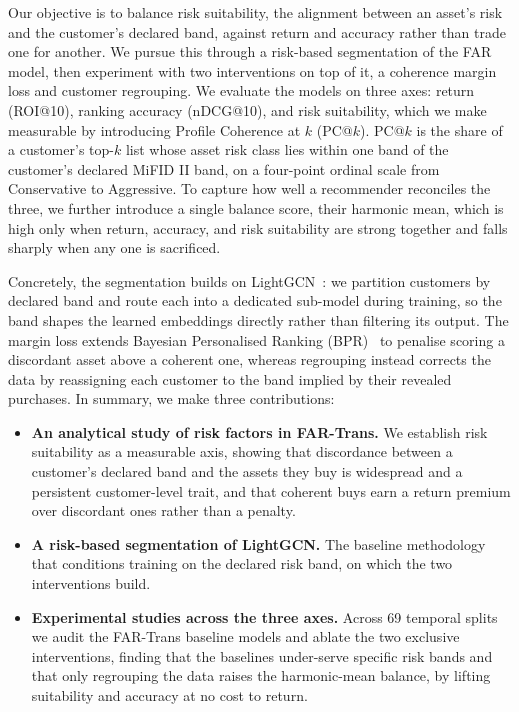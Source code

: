 Our objective is to balance risk suitability, the alignment between an asset's risk and the customer's declared band, against return and accuracy rather than trade one for another. We pursue this through a risk-based segmentation of the FAR model, then experiment with two interventions on top of it, a coherence margin loss and customer regrouping. We evaluate the models on three axes: return (ROI@10), ranking accuracy (nDCG@10), and risk suitability, which we make measurable by introducing Profile Coherence at $k$ (PC@$k$). PC@$k$ is the share of a customer's top-$k$ list whose asset risk class lies within one band of the customer's declared MiFID II band, on a four-point ordinal scale from Conservative to Aggressive. To capture how well a recommender reconciles the three, we further introduce a single balance score, their harmonic mean, which is high only when return, accuracy, and risk suitability are strong together and falls sharply when any one is sacrificed.

Concretely, the segmentation builds on LightGCN~\cite{he2020lightgcnsimplifyingpoweringgraph}: we partition customers by declared band and route each into a dedicated sub-model during training, so the band shapes the learned embeddings directly rather than filtering its output. The margin loss extends Bayesian Personalised Ranking (BPR)~\cite{rendle2012bprbayesianpersonalizedranking} to penalise scoring a discordant asset above a coherent one, whereas regrouping instead corrects the data by reassigning each customer to the band implied by their revealed purchases. In summary, we make three contributions:
\begin{itemize}
    \item \textbf{An analytical study of risk factors in FAR-Trans.} We establish risk suitability as a measurable axis, showing that discordance between a customer's declared band and the assets they buy is widespread and a persistent customer-level trait, and that coherent buys earn a return premium over discordant ones rather than a penalty.
    \item \textbf{A risk-based segmentation of LightGCN.} The baseline methodology that conditions training on the declared risk band, on which the two interventions build.
    \item \textbf{Experimental studies across the three axes.} Across 69 temporal splits we audit the FAR-Trans baseline models and ablate the two exclusive interventions, finding that the baselines under-serve specific risk bands and that only regrouping the data raises the harmonic-mean balance, by lifting suitability and accuracy at no cost to return.
\end{itemize}
